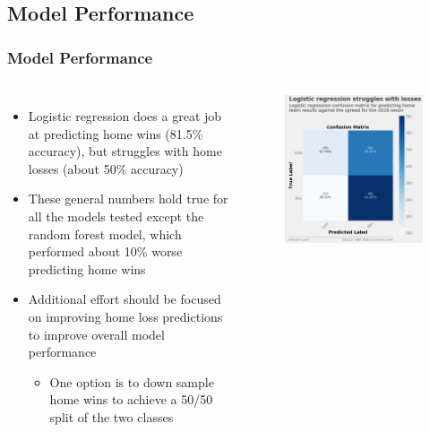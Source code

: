 \documentclass{beamer}
\begin{document}
\subsection{Model Performance}
\begin{frame}
\frametitle{Model Performance}
\begin{columns}
\begin{itemize}
    \item Logistic regression does a great job at predicting home wins (81.5\% accuracy), but struggles with home losses (about 50\% accuracy)
    \item These general numbers hold true for all the models tested except the random forest model, which performed about 10\% worse predicting home wins
    \item Additional effort should be focused on improving home loss predictions to improve overall model performance
    \begin{itemize}
        \item One option is to down sample home wins to achieve a 50/50 split of the two classes
    \end{itemize}
\end{itemize}
\vspace{-0.5cm}
\begin{figure}
\includegraphics[scale=0.23]{../docs/assets/images/model-performance/logistic-regression-confusion-matrix.png}

\end{figure}
\end{columns}
\end{frame}
\end{document}
